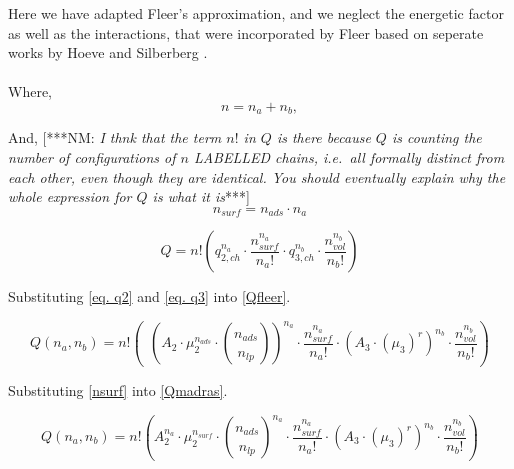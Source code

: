 \documentclass[10pt,letterpaper]{article}
\begin{document}
\noindent Here we have adapted Fleer's approximation, 
%
and we neglect the energetic factor as well as the interactions, that were incorporated by Fleer based on seperate works by Hoeve \cite{hoeve1970general}  and Silberberg \cite{silberberg1968adsorption}.\\\\

\noindent Where,
\begin{equation}
	n=n_a+n_b,
	\label{eq. n}
\end{equation}

\noindent And,
[***NM: \textit{I thnk that the term $n!$ in $Q$ is
there because $Q$ is counting the number of 
configurations of $n$ LABELLED chains, i.e.\ all
formally distinct from each other, even though
they are identical.  You should eventually 
explain why the whole expression for $Q$ is what it is}***]
\begin{equation}
	n_{surf}=n_{ads}\cdotp n_{a}
	\label{nsurf}
\end{equation}


\begin{equation}
	Q=
	n!
	\left(
		q_{2,ch}^{n_{a}}
		\cdot
		\frac{
			n_{surf}^{n_{a}}
		}{
			n_a!
		}
		\cdot
		q_{3,ch}^{n_{b}}
		\cdot
		\frac{
			n_{vol}^{n_{b}}
		}{
			n_b!
		}
	\right)
	\label{Qfleer}
\end{equation}

\noindent Substituting \ref{eq. q2} and \ref{eq. q3} into \ref{Qfleer}.

\begin{equation}
	Q(n_a,n_b)=
	n!
	\left(~~
		\left(
		A_2
		\cdot 
		\mu_{2}^{n_{ads}}
		\cdot 
		\binom{
			n_{ads}
		}{
			n_{lp}
		}
		\right)^{n_{a}} 
		\cdot
		\frac{
			n_{surf}^{n_{a}}
		}{
			n_a!
		}
		\cdot
		\left(
			A_3
			\cdot
			\left(
				\mu_{3}
			\right)^{r}
		\right)^{n_{b}}
		\cdot
		\frac{
			n_{vol}^{n_{b}}
		}{
			n_b!
		}
	\right)
	\label{Qmadras}
\end{equation}

\noindent Substituting \ref{nsurf} into \ref{Qmadras}.

\begin{equation}
	Q(n_a,n_b)=
	n!
	\left(
		A_2^{n_{a}}
		\cdot 
		\mu_{2}^{n_{surf}} 
		\cdot 
		\binom{
			n_{ads}
		}{
			n_{lp}
		}^{n_{a}}
		\cdot
		\frac{
			n_{surf}^{n_{a}}
		}{
			n_a!
		}
		\cdot
		\left(
		A_3
		\cdot
		(\mu_{3})^{r}
	\right)^{n_{b}}
	\cdot
	\frac{
		n_{vol}^{n_{b}}
	}{
		n_b!
	}
	\right)
	\label{Qwithnsurf}
\end{equation}
\end{document}
